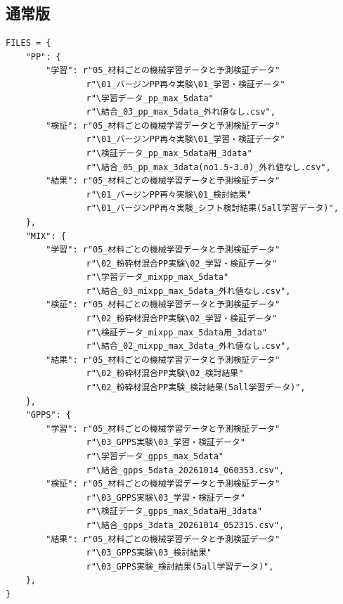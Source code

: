\documentclass[paper=a4paper,fontsize=10.5pt,line_length=44zw,number_of_lines=40]{jlreq}
\begin{document}
\subsection*{通常版}
\begin{Verbatim}[fontsize=\footnotesize,frame=single]
FILES = {
    "PP": {
        "学習": r"05_材料ごとの機械学習データと予測検証データ"
                r"\01_バージンPP再々実験\01_学習・検証データ"
                r"\学習データ_pp_max_5data"
                r"\結合_03_pp_max_5data_外れ値なし.csv",
        "検証": r"05_材料ごとの機械学習データと予測検証データ"
                r"\01_バージンPP再々実験\01_学習・検証データ"
                r"\検証データ_pp_max_5data用_3data"
                r"\結合_05_pp_max_3data(no1.5-3.0)_外れ値なし.csv",
        "結果": r"05_材料ごとの機械学習データと予測検証データ"
                r"\01_バージンPP再々実験\01_検討結果"
                r"\01_バージンPP再々実験_シフト検討結果(5all学習データ)",
    },
    "MIX": {
        "学習": r"05_材料ごとの機械学習データと予測検証データ"
                r"\02_粉砕材混合PP実験\02_学習・検証データ"
                r"\学習データ_mixpp_max_5data"
                r"\結合_03_mixpp_max_5data_外れ値なし.csv",
        "検証": r"05_材料ごとの機械学習データと予測検証データ"
                r"\02_粉砕材混合PP実験\02_学習・検証データ"
                r"\検証データ_mixpp_max_5data用_3data"
                r"\結合_02_mixpp_max_3data_外れ値なし.csv",
        "結果": r"05_材料ごとの機械学習データと予測検証データ"
                r"\02_粉砕材混合PP実験\02_検討結果"
                r"\02_粉砕材混合PP実験_検討結果(5all学習データ)",
    },
    "GPPS": {
        "学習": r"05_材料ごとの機械学習データと予測検証データ"
                r"\03_GPPS実験\03_学習・検証データ"
                r"\学習データ_gpps_max_5data"
                r"\結合_gpps_5data_20261014_060353.csv",
        "検証": r"05_材料ごとの機械学習データと予測検証データ"
                r"\03_GPPS実験\03_学習・検証データ"
                r"\検証データ_gpps_max_5data用_3data"
                r"\結合_gpps_3data_20261014_052315.csv",
        "結果": r"05_材料ごとの機械学習データと予測検証データ"
                r"\03_GPPS実験\03_検討結果"
                r"\03_GPPS実験_検討結果(5all学習データ)",
    },
}
\end{Verbatim}
\end{document}
